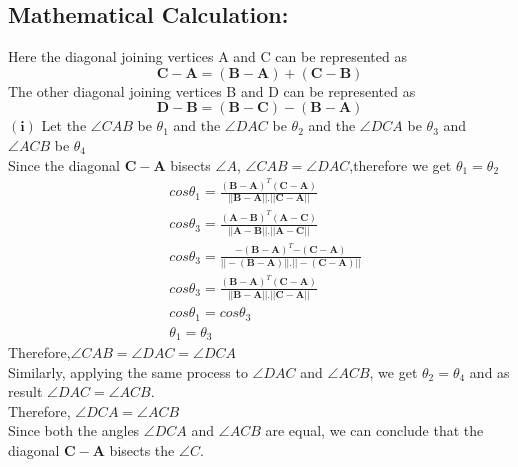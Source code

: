 \documentclass[a4paper,12pt,twocolumn]{article}
\let\vec\mathbf
\begin{document}
\subsection{Mathematical Calculation:}
Here the diagonal joining vertices A and C  can be represented as\\
\begin{equation}
\vec{C-A} = \vec{(B-A)}+\vec{(C-B)}
\end{equation}
The other diagonal joining vertices B and D can be represented as\\
\begin{equation}
\vec{D-B} = \vec{(B-C)}-\vec{(B-A)}
\end{equation}
$\boldsymbol{(i)}$ Let the $\angle{CAB}$  be $\theta_1$ and the $\angle{DAC}$  be $\theta_2$ and the $\angle{DCA}$  be $\theta_3$ and $\angle{ACB}$ be $\theta_4$\\
Since the diagonal $\vec{C-A}$ bisects $\angle{A}$, $\angle{CAB} = \angle{DAC}$,therefore we get $\theta_1=\theta_2$\\
\begin{align*}
&cos\theta_1 = \frac{(\vec{B-A})^T(\vec{C-A})}{||\vec{B-A}||.||\vec{C-A}||}\\
&cos\theta_3 = \frac{(\vec{A-B})^T(\vec{A-C})}{||\vec{A-B}||.||\vec{A-C}||}\\
&cos\theta_3 = \frac{\vec{-(B-A)}^T\vec{-(C-A)}}{\vec{||-(B-A)||}.\vec{||-(C-A)||}}\\
&cos\theta_3 = \frac{\vec{(B-A)}^T\vec{(C-A)}}{\vec{||B-A||}.\vec{||C-A||}}\\
&cos\theta_1 = cos\theta_3\\
&\theta_1=\theta_3
\end{align*}
Therefore,$\angle{CAB}=\angle{DAC}=\angle{DCA}$\\
Similarly, applying the same process to $\angle{DAC}$ and $\angle{ACB}$, we get $\theta_2=\theta_4$ and as result $\angle{DAC}=\angle{ACB}$.\\
Therefore, $\angle{DCA} = \angle{ACB}$\\
Since both the angles $\angle{DCA}$ and $\angle{ACB}$ are equal, we can conclude that the diagonal $\vec{C-A}$ bisects the $\angle{C}$.\\ 
\end{document}

